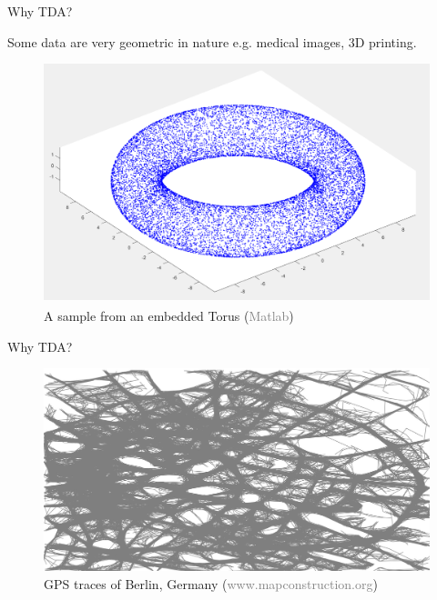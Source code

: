 \documentclass[10pt,sans-serif]{beamer}
\begin{document}
\begin{frame}{Why TDA?}
  \begin{block}{}
    Some data are very geometric in nature e.g. medical images, 3D printing.
  \end{block}
  \begin{figure}
    \centering
    \includegraphics[scale=0.3]{torus}
    \caption{A sample from an embedded Torus 
      (\textcolor{gray}{Matlab\textsuperscript\textregistered})}
  \end{figure}
\end{frame}

\begin{frame}{Why TDA?}
  \begin{figure}
    \centering
    \includegraphics[scale=0.3]{Berlin}
    \caption{GPS traces of Berlin, Germany
      (\textcolor{gray}{www.mapconstruction.org})}
  \end{figure}
\end{frame}
\end{document}
